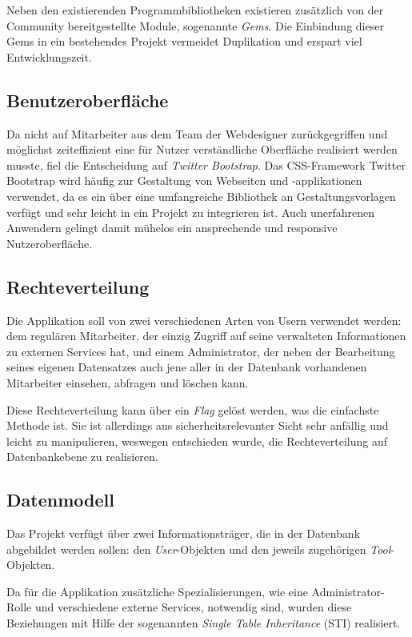 Neben den existierenden Programmbibliotheken existieren zusätzlich von der Community bereitgestellte Module,
sogenannte \textit{Gems}. Die Einbindung dieser Gems in ein bestehendes Projekt vermeidet
Duplikation und erspart viel Entwicklungszeit.

\subsection{Benutzeroberfläche}
\label{sec:Benutzeroberfläche}
Da nicht auf Mitarbeiter aus dem Team der Webdesigner zurückgegriffen und möglichst zeiteffizient
eine für Nutzer verständliche Oberfläche realisiert werden musste, fiel die Entscheidung auf
\textit{Twitter Bootstrap}.
Das CSS-Framework Twitter Bootstrap wird häufig zur Gestaltung von Webseiten und
-applikationen verwendet, da es ein über eine umfangreiche Bibliothek an Gestaltungsvorlagen
verfügt und sehr leicht in ein Projekt zu integrieren ist. Auch unerfahrenen Anwendern gelingt damit
mühelos ein ansprechende und responsive Nutzeroberfläche.

\subsection{Rechteverteilung}
\label{sec:Rechteverteilung}
Die Applikation soll von zwei verschiedenen Arten von Usern verwendet werden: dem regulären
Mitarbeiter, der einzig Zugriff auf seine verwalteten Informationen zu externen Services hat, und
einem Administrator, der neben der Bearbeitung seines eigenen Datensatzes auch jene aller in der
Datenbank vorhandenen Mitarbeiter einsehen, abfragen und löschen kann.

Diese Rechteverteilung kann über ein \textit{Flag} gelöst werden, was die einfachste Methode ist.
Sie ist allerdings aus sicherheitsrelevanter Sicht sehr anfällig und leicht zu manipulieren,
weswegen entschieden wurde, die Rechteverteilung auf Datenbankebene zu realisieren.

\subsection{Datenmodell}
\label{sec:Datenmodell}
Das Projekt verfügt über zwei Informationsträger, die in der Datenbank abgebildet werden
sollen: den \textit{User}-Objekten und den jeweils zugehörigen \textit{Tool}-Objekten.


Da für die Applikation zusätzliche Spezialisierungen, wie eine Administrator-Rolle und verschiedene
externe Services, notwendig sind, wurden diese Beziehungen mit Hilfe der sogenannten
\textit{Single Table Inheritance} (\acs{STI}) realisiert.

